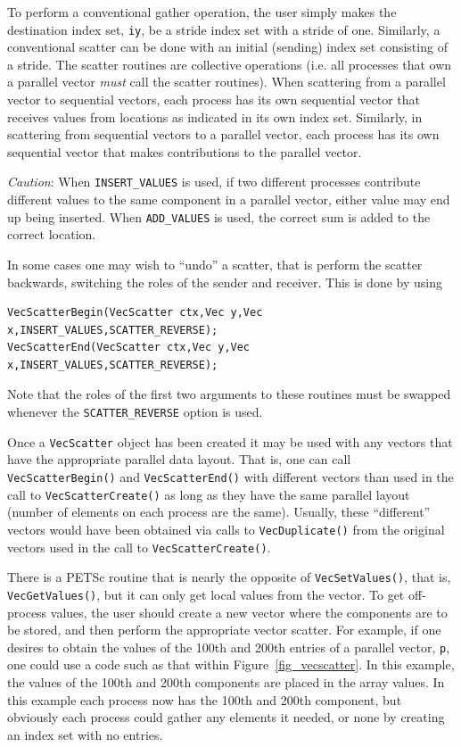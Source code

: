 To perform a conventional gather operation, the user simply makes
 the destination index set,
\lstinline{iy}, be a stride index set with a stride of one.  Similarly, a
conventional scatter can be done with an initial (sending) index set
consisting of a stride.  The scatter routines are collective operations
(i.e. all processes that own
a parallel vector {\em must} call the scatter routines). When scattering from a
parallel vector to sequential vectors, each process has its own sequential
vector that receives values from locations as indicated in its own
index set. Similarly, in scattering
from sequential vectors to a parallel vector, each process has its
own sequential vector that makes contributions to the parallel vector.

{\em Caution}: When \lstinline{INSERT_VALUES} is used, if two different
processes contribute different values to the same component in a
parallel vector, either value may end up being inserted. When
\lstinline{ADD_VALUES} is used, the correct sum is added to the correct
location.

In some cases one may wish to ``undo'' a scatter, that is perform the
scatter backwards, switching the roles of the sender and receiver. This is
done by using
\begin{lstlisting}
VecScatterBegin(VecScatter ctx,Vec y,Vec x,INSERT_VALUES,SCATTER_REVERSE);
VecScatterEnd(VecScatter ctx,Vec y,Vec x,INSERT_VALUES,SCATTER_REVERSE);
\end{lstlisting}
Note that the roles of the first
two arguments to these routines must be swapped whenever the \lstinline{SCATTER_REVERSE}
option is used.

Once a \lstinline{VecScatter} object has been created it may be used with any vectors
that have the appropriate parallel data layout. That is, one can call
\lstinline{VecScatterBegin()} and \lstinline{VecScatterEnd()} with different vectors than
used in the call to \lstinline{VecScatterCreate()} as long as they have the same
parallel layout (number of elements on each process are the same). Usually,
these ``different'' vectors would have been obtained via calls to
\lstinline{VecDuplicate()} from the original vectors used in the call to
\lstinline{VecScatterCreate()}.

There is a PETSc routine that is nearly the opposite of \lstinline{VecSetValues()}, that is, \lstinline{VecGetValues()}, but it can only get local values from the vector.
To get off-process values, the user should create a new vector where
the components are to be stored, and then perform the appropriate vector
scatter. For example, if one desires to obtain the values of the
100th and 200th entries of a parallel vector, \lstinline{p}, one could use
a code such as that within Figure~\ref{fig_vecscatter}.
In this example, the values of the 100th and 200th components are
placed in the array
values. In this example each process now has the 100th and
200th component, but obviously each process could gather any
elements it needed, or none by creating an index set with no entries.

